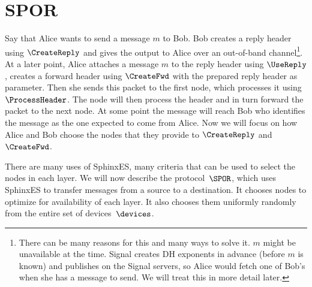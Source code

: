 

\section{\Acf*{SPOR}}%
\label{SPOR}%
\label{sec:SPOR}%
\label{sec:message_passing}%

Say that Alice wants to send a message \(m\) to Bob.
Bob creates a reply header using \(\CreateReply\) and gives the output to Alice 
over an out-of-band channel\footnote{%
  There can be many reasons for this and many ways to solve it.
  \Eg \(m\) might be unavailable at the time.
  Signal creates \ac{DH} exponents in advance (before \(m\) is known) and 
  publishes on the Signal servers, so Alice would fetch one of Bob's when she 
  has a message to send.
  We will treat this in more detail later.
}.
At a later point, Alice attaches a message \(m\) to the reply header using 
\(\UseReply\), creates a forward header using \(\CreateFwd\) with the prepared 
reply header as parameter.  
Then she sends this packet to the first node, which processes it using 
\(\ProcessHeader\).
The node will then process the header and in turn forward the packet to the 
next node.
At some point the message will reach Bob who identifies the message as the 
one expected to come from Alice.
Now we will focus on how Alice and Bob choose the nodes that they provide to 
\(\CreateReply\) and \(\CreateFwd\).


There are many uses of SphinxES, many criteria that can be used to select the 
nodes in each layer.
We will now describe the protocol~\(\SPOR\), which uses SphinxES to transfer 
messages from a source to a destination.
It chooses nodes to optimize for availability of each layer.
It also chooses them uniformly randomly from the entire set of 
devices~\(\devices\).

